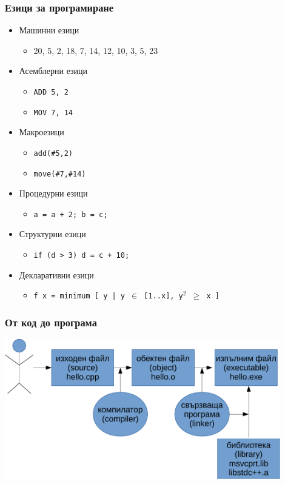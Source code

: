 \documentclass{beamer}
\begin{document}
\begin{frame}
  \frametitle{Езици за програмиране}
  \begin{itemize}[<+->]
  \item Машинни езици
    \begin{itemize}
    \item 20, 5, 2, 18, 7, 14, 12, 10, 3, 5, 23
    \end{itemize}
  \item Асемблерни езици
    \begin{itemize}
    \item \tt{ADD 5, 2}
    \item \tt{MOV 7, 14}
    \end{itemize}
  \item Макроезици
    \begin{itemize}
    \item \tt{add(\#5,2)}
    \item \tt{move(\#7,\#14)}
    \end{itemize}
  \item Процедурни езици
    \begin{itemize}
    \item \tt{a = a + 2; b = c;}
    \end{itemize}
  \item Структурни езици
    \begin{itemize}
    \item \tt{if (d > 3) d = c + 10;}
    \end{itemize}
  \item Декларативни езици
    \begin{itemize}
    \item \tt{f x = minimum [ y | y $\in$ [1..x], y${^2}$ $\geq$ x ]}
    \end{itemize}
  \end{itemize}
\end{frame}

\begin{frame}
  \frametitle{От код до програма}
  \includegraphics[width=0.9\textwidth]{images/compile.pdf}
\end{frame}
\end{document}
